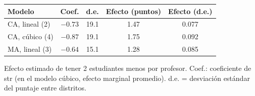 
\begin{tabular}{lcccc}
\toprule
Modelo & Coef. & d.e. & Efecto (puntos) & Efecto (d.e.)\\
\midrule
CA, lineal (2) & $-0.73$ & 19.1 & 1.47 & 0.077\\
CA, c\'ubico (4) & $-0.87$ & 19.1 & 1.75 & 0.092\\
MA, lineal (3) & $-0.64$ & 15.1 & 1.28 & 0.085\\
\bottomrule
\end{tabular}
\par\vspace{3pt}
{\footnotesize\parbox{0.9\linewidth}{\centering Efecto estimado de tener 2 estudiantes menos por profesor. Coef.: coeficiente de str (en el modelo c\'ubico, efecto marginal promedio). d.e. = desviaci\'on est\'andar del puntaje entre distritos.}}

